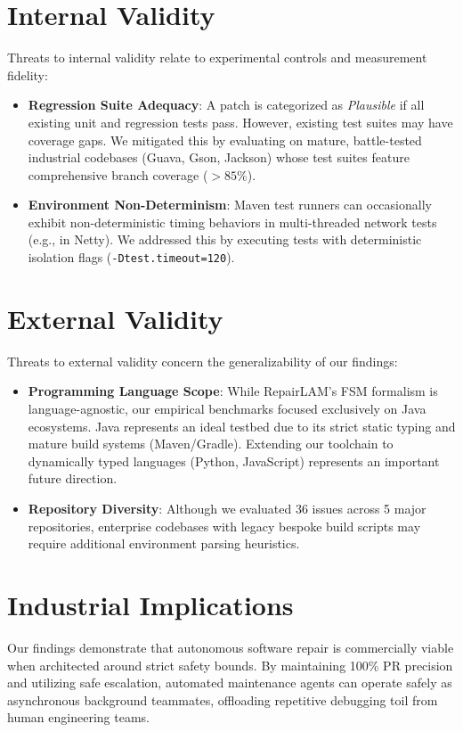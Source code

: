 \documentclass[12pt,a4paper]{report}
\begin{document}
\section{Internal Validity}
Threats to internal validity relate to experimental controls and measurement fidelity:
\begin{itemize}
    \item \textbf{Regression Suite Adequacy}: A patch is categorized as \textit{Plausible} if all existing unit and regression tests pass. However, existing test suites may have coverage gaps. We mitigated this by evaluating on mature, battle-tested industrial codebases (Guava, Gson, Jackson) whose test suites feature comprehensive branch coverage ($>85\%$).
    \item \textbf{Environment Non-Determinism}: Maven test runners can occasionally exhibit non-deterministic timing behaviors in multi-threaded network tests (e.g., in Netty). We addressed this by executing tests with deterministic isolation flags (\texttt{-Dtest.timeout=120}).
\end{itemize}

\section{External Validity}
Threats to external validity concern the generalizability of our findings:
\begin{itemize}
    \item \textbf{Programming Language Scope}: While RepairLAM's FSM formalism is language-agnostic, our empirical benchmarks focused exclusively on Java ecosystems. Java represents an ideal testbed due to its strict static typing and mature build systems (Maven/Gradle). Extending our toolchain to dynamically typed languages (Python, JavaScript) represents an important future direction.
    \item \textbf{Repository Diversity}: Although we evaluated 36 issues across 5 major repositories, enterprise codebases with legacy bespoke build scripts may require additional environment parsing heuristics.
\end{itemize}

\section{Industrial Implications}
Our findings demonstrate that autonomous software repair is commercially viable when architected around strict safety bounds. By maintaining 100\% PR precision and utilizing safe escalation, automated maintenance agents can operate safely as asynchronous background teammates, offloading repetitive debugging toil from human engineering teams.
\end{document}
